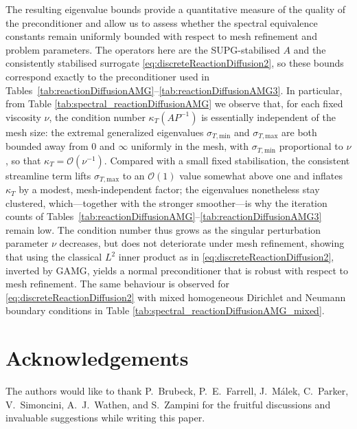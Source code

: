 \documentclass[hidelinks,onefignum,onetabnum]{siamart220329}
\newcommand{\bb}[1]{#1}
\begin{document}
The resulting eigenvalue bounds provide a quantitative measure of the quality of the preconditioner and allow us to assess whether the spectral equivalence constants remain uniformly bounded with respect to mesh refinement and problem parameters.
\bb{The operators here are the SUPG-stabilised $A$ and the consistently stabilised surrogate \eqref{eq:discreteReactionDiffusion2}, so these bounds correspond exactly to the preconditioner used in Tables~\ref{tab:reactionDiffusionAMG}--\ref{tab:reactionDiffusionAMG3}. In particular, from Table \ref{tab:spectral_reactionDiffusionAMG} we observe that, for each fixed viscosity $\nu$, the condition number $\kappa_T(AP^{-1})$ is essentially independent of the mesh size: the extremal generalized eigenvalues $\sigma_{T,\text{min}}$ and $\sigma_{T,\text{max}}$ are both bounded away from $0$ and $\infty$ uniformly in the mesh, with $\sigma_{T,\text{min}}$ proportional to $\nu$, so that $\kappa_T = \mathcal{O}(\nu^{-1})$. Compared with a small fixed stabilisation, the consistent streamline term lifts $\sigma_{T,\text{max}}$ to an $\mathcal{O}(1)$ value somewhat above one and inflates $\kappa_T$ by a modest, mesh-independent factor; the eigenvalues nonetheless stay clustered, which---together with the stronger smoother---is why the iteration counts of Tables~\ref{tab:reactionDiffusionAMG}--\ref{tab:reactionDiffusionAMG3} remain low.
The condition number thus grows as the singular perturbation parameter $\nu$ decreases, but does not deteriorate under mesh refinement, showing that using the classical $L^2$ inner product as in \eqref{eq:discreteReactionDiffusion2}, inverted by GAMG, yields a normal preconditioner that is robust with respect to mesh refinement.
The same behaviour is observed for \eqref{eq:discreteReactionDiffusion2} with mixed homogeneous Dirichlet and Neumann boundary conditions in Table \ref{tab:spectral_reactionDiffusionAMG_mixed}.}



\section*{Acknowledgements}
The authors would like to thank P.~Brubeck, P.~E.~Farrell, J.~M\'{a}lek, C.~Parker, V.~Simoncini, A.~J.~Wathen, and S.~Zampini for the fruitful discussions and invaluable suggestions while writing this paper.


\end{document}
